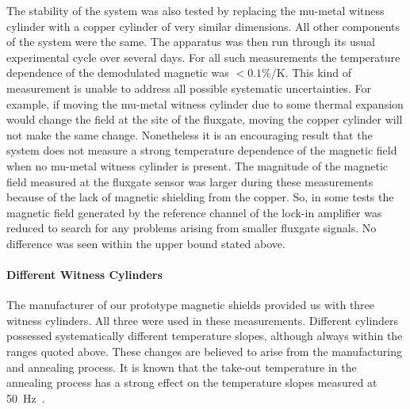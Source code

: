 


The stability of the system was also tested by replacing the mu-metal
witness cylinder with a copper cylinder of very similar dimensions.
All other components of the system were the same.  The apparatus was
then run through its usual experimental cycle over several days.  For
all such measurements the temperature dependence of the demodulated
magnetic was $<0.1$\%/K.  This kind of measurement is unable to
address all possible systematic uncertainties.  For example, if moving
the mu-metal witness cylinder due to some thermal expansion would
change the field at the site of the fluxgate, moving the copper
cylinder will not make the same change.  Nonetheless it is an
encouraging result that the system does not measure a strong
temperature dependence of the magnetic field when no mu-metal witness
cylinder is present.  The magnitude of the magnetic field measured at
the fluxgate sensor was larger during these measurements because of
the lack of magnetic shielding from the copper.  So, in some tests the
magnetic field generated by the reference channel of the lock-in
amplifier was reduced to search for any problems arising from smaller
fluxgate signals.  No difference was seen within the upper bound
stated above.

\paragraph{Different Witness Cylinders}

The manufacturer of our prototype magnetic shields provided us with
three witness cylinders.  All three were used in these measurements.
Different cylinders possessed systematically different temperature
slopes, although always within the ranges quoted above.  These changes
are believed to arise from the manufacturing and annealing process.
It is known that the take-out temperature in the annealing process has
a strong effect on the temperature slopes measured at
50~Hz~\cite{bib:kruppvdm}.




